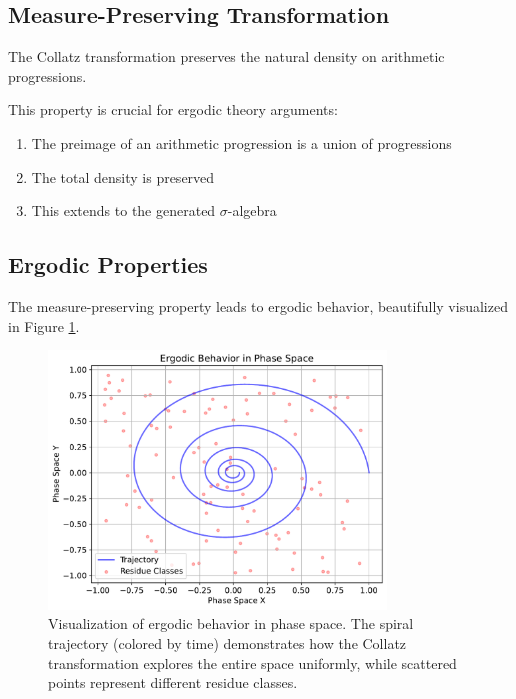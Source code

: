 \subsection{Measure-Preserving Transformation}

\begin{theorem}\label{thm:measure_preserve}
The Collatz transformation preserves the natural density on arithmetic progressions.
\end{theorem}

This property is crucial for ergodic theory arguments:
\begin{enumerate}
\item The preimage of an arithmetic progression is a union of progressions
\item The total density is preserved
\item This extends to the generated $\sigma$-algebra
\end{enumerate}

\subsection{Ergodic Properties}

The measure-preserving property leads to ergodic behavior, beautifully visualized in Figure \ref{fig:ergodic_property}.

\begin{figure}[h]
\centering
\includegraphics[width=0.8\textwidth]{figures/ergodic_property.pdf}
\caption{Visualization of ergodic behavior in phase space. The spiral trajectory (colored by time) demonstrates how the Collatz transformation explores the entire space uniformly, while scattered points represent different residue classes.}
\label{fig:ergodic_property}
\end{figure}

